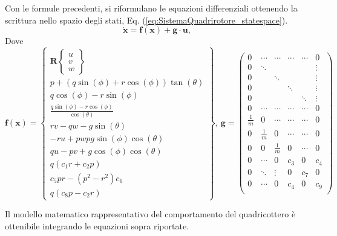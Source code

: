 Con le formule precedenti, si riformulano le equazioni differenziali ottenendo la scrittura nello spazio degli stati, Eq. (\ref{eq:SistemaQuadrirotore_statespace}).
\begin{equation}\label{eq:SistemaQuadrirotore_statespace}
\mathbf{\dot{x}} = \mathbf{f(x)} + \mathbf{g} \cdot \mathbf{u},
\end{equation}
Dove
\[
	\mathbf{f(x)} = \begin{Bmatrix}
		\mathbf{R} \begin{Bmatrix}
			u \\ v \\ w
		\end{Bmatrix} \\
		p + (q\sin(\phi)+r\cos(\phi))\tan(\theta) \\
		q\cos(\phi) - r\sin(\phi) \\
		\frac{q\sin(\phi) - r\cos(\phi)}{\cos(\theta)}\\
		rv-qw-g\sin(\theta)\\
		-ru + pw p g \sin(\phi)\cos(\theta)\\
		qu - pv + g \cos(\phi)\cos(\theta)\\
		q (c_1 r + c_2 p)\\
		c_5 pr - (p^2-r^2) c_6 \\
		q(c_8 p - c_2 r)
	\end{Bmatrix}, \ \mathbf{g} =
	\begin{pmatrix}
		0 & \cdots & \cdots & \cdots & \cdots & 0 \\
		0 & \ddots & & & & \vdots \\
		0 & & \ddots & & & \vdots \\
		0 & & & \ddots & & \vdots \\
		0 & & & & \ddots & \vdots \\
		0 & \cdots & \cdots & \cdots & \cdots & 0 \\
		\frac{1}{m} & 0 & \cdots & \cdots & \cdots & 0 \\
		0 & \frac{1}{m} & 0 & \cdots & \cdots & 0 \\
		0 & 0 & \frac{1}{m} & 0 & \cdots & 0 \\
		0 & \cdots & 0 & c_3 & 0 & c_4 \\
		0 & \ddots & \vdots & 0 & c_7 & 0 \\
		0 & \cdots & 0 & c_4 & 0 & c_9 \\
	\end{pmatrix}
\]

Il modello matematico rappresentativo del comportamento del quadricottero è ottenibile integrando le equazioni sopra riportate.

